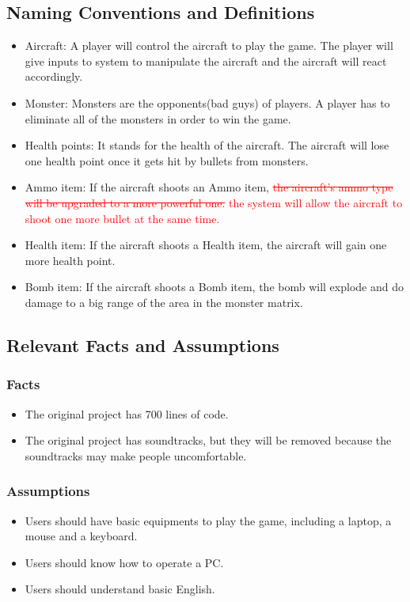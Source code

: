 \documentclass[12pt]{article}
\begin{document}
\subsection{Naming Conventions and Definitions}
\begin{itemize}
\item Aircraft: A player will control the aircraft to play the game. The player will give inputs to system to manipulate the aircraft and the aircraft will react accordingly.
\item Monster: Monsters are the opponents(bad guys) of players. A player has to eliminate all of the monsters 
in order to win the game.
\item Health points: It stands for the health of the aircraft. The aircraft will lose one health point once it gets hit
by bullets from monsters.
\item Ammo item: If the aircraft shoots an Ammo item, \textcolor{red}{\st{the aircraft's ammo type will be upgraded to a more powerful one.} the system will 
allow the aircraft to shoot one more bullet at the same time.}
\item Health item: If the aircraft shoots a Health item, the aircraft will gain one more health point.
\item Bomb item: If the aircraft shoots a Bomb item, the bomb will explode and do damage to a big range of the area in the
monster matrix.
\end{itemize}
\subsection{Relevant Facts and Assumptions}
\subsubsection{Facts}
\begin{itemize}
\item The original project has 700 lines of code.
\item The original project has soundtracks, but they will be removed because the soundtracks may make people uncomfortable.
\end{itemize}
\subsubsection{Assumptions}
\begin{itemize}
\item Users should have basic equipments to play the game,
including a laptop, a mouse and a keyboard.
\item Users should know how to operate a PC.
\item Users should understand basic English.
\end{itemize}
\newpage
\end{document}

